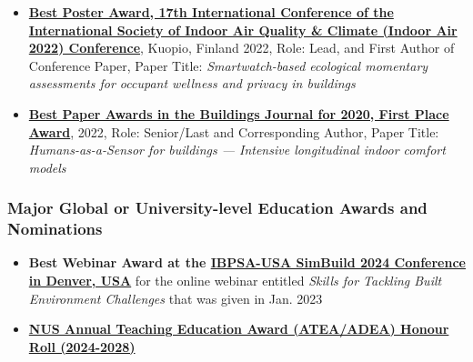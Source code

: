\documentclass[10pt,a4paper]{article}
\begin{document}
\begin{small}
\begin{itemize}
  \item \textbf{\href{https://www.dropbox.com/s/itgecftt1gc3syq/IndoorAirBestPosterAwardCertificateMiller.pdf?dl=0}{Best Poster Award, 17th International Conference of the International Society of Indoor Air Quality \& Climate (Indoor Air 2022) Conference}}, Kuopio, Finland 2022, Role: Lead, and First Author of Conference Paper, Paper Title: \emph{Smartwatch-based ecological momentary assessments for occupant wellness and privacy in buildings}%

  \item \textbf{\href{https://www.mdpi.com/journal/buildings/awards/1245}{Best Paper Awards in the Buildings Journal for 2020, First Place Award}}, 2022, Role: Senior/Last and Corresponding Author, Paper Title: \emph{Humans-as-a-Sensor for buildings — Intensive longitudinal indoor comfort models}%



\end{itemize}

\subsubsection*{Major Global or University-level Education Awards and Nominations}

\begin{itemize}

  \item \textbf{Best Webinar Award at the \href{https://www.ibpsa.us/simbuild-2024/}{IBPSA-USA SimBuild 2024 Conference in Denver, USA}} for the online webinar entitled \emph{Skills for Tackling Built Environment Challenges} that was given in Jan. 2023%

  \item \textbf{\href{https://ctlt.nus.edu.sg/teaching-awards/award-winners/}{NUS Annual Teaching Education Award (ATEA/ADEA) Honour Roll (2024-2028)}}%


\end{itemize}
\end{small}
\end{document}
